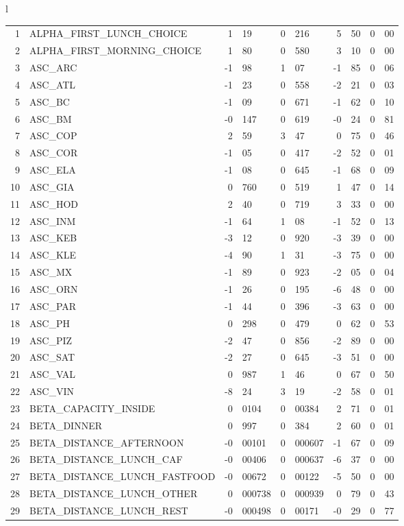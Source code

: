 \begin{tabular}{l}
\begin{tabular}{rlr@{.}lr@{.}lr@{.}lr@{.}l}
1 & ALPHA_FIRST_LUNCH_CHOICE & 1&19 & 0&216 & 5&50 & 0&00\\
2 & ALPHA_FIRST_MORNING_CHOICE & 1&80 & 0&580 & 3&10 & 0&00\\
3 & ASC_ARC & -1&98 & 1&07 & -1&85 & 0&06\\
4 & ASC_ATL  & -1&23 & 0&558 & -2&21 & 0&03\\
5 & ASC_BC & -1&09 & 0&671 & -1&62 & 0&10\\
6 & ASC_BM  & -0&147 & 0&619 & -0&24 & 0&81\\
7 & ASC_COP & 2&59 & 3&47 & 0&75 & 0&46\\
8 & ASC_COR  & -1&05 & 0&417 & -2&52 & 0&01\\
9 & ASC_ELA  & -1&08 & 0&645 & -1&68 & 0&09\\
10 & ASC_GIA  & 0&760 & 0&519 & 1&47 & 0&14\\
11 & ASC_HOD  & 2&40 & 0&719 & 3&33 & 0&00\\
12 & ASC_INM  & -1&64 & 1&08 & -1&52 & 0&13\\
13 & ASC_KEB  & -3&12 & 0&920 & -3&39 & 0&00\\
14 & ASC_KLE & -4&90 & 1&31 & -3&75 & 0&00\\
15 & ASC_MX  & -1&89 & 0&923 & -2&05 & 0&04\\
16 & ASC_ORN  & -1&26 & 0&195 & -6&48 & 0&00\\
17 & ASC_PAR  & -1&44 & 0&396 & -3&63 & 0&00\\
18 & ASC_PH  & 0&298 & 0&479 & 0&62 & 0&53\\
19 & ASC_PIZ  & -2&47 & 0&856 & -2&89 & 0&00\\
20 & ASC_SAT  & -2&27 & 0&645 & -3&51 & 0&00\\
21 & ASC_VAL  & 0&987 & 1&46 & 0&67 & 0&50\\
22 & ASC_VIN & -8&24 & 3&19 & -2&58 & 0&01\\
23 & BETA_CAPACITY_INSIDE & 0&0104 & 0&00384 & 2&71 & 0&01\\
24 & BETA_DINNER & 0&997 & 0&384 & 2&60 & 0&01\\
25 & BETA_DISTANCE_AFTERNOON & -0&00101 & 0&000607 & -1&67 & 0&09\\
26 & BETA_DISTANCE_LUNCH_CAF & -0&00406 & 0&000637 & -6&37 & 0&00\\
27 & BETA_DISTANCE_LUNCH_FASTFOOD & -0&00672 & 0&00122 & -5&50 & 0&00\\
28 & BETA_DISTANCE_LUNCH_OTHER & 0&000738 & 0&000939 & 0&79 & 0&43\\
29 & BETA_DISTANCE_LUNCH_REST & -0&000498 & 0&00171 & -0&29 & 0&77\\

\end{tabular}
\end{tabular}
